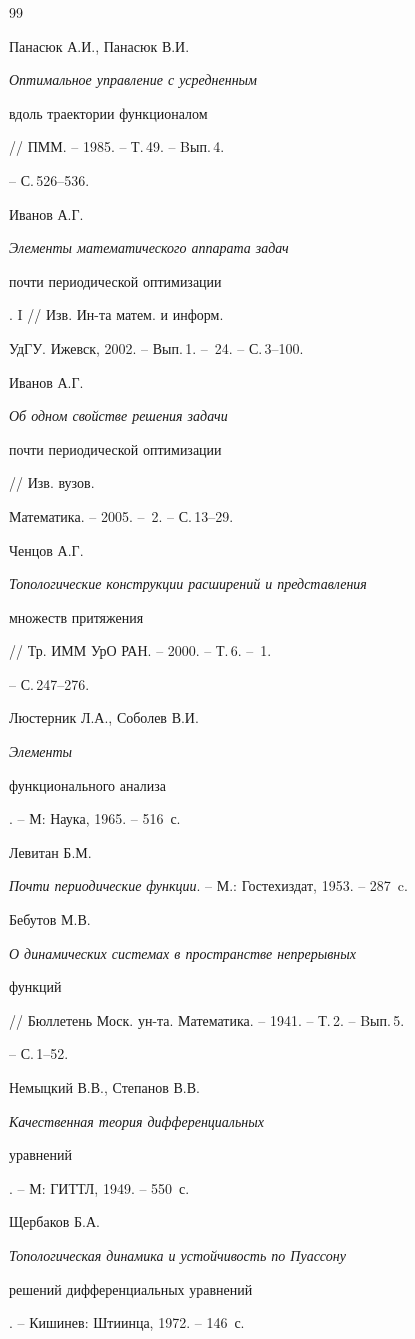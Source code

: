 \begin{thebibliography}{99}


Панасюк А.И., Панасюк В.И. {\em Оптимальное управление с усредненным


вдоль траектории функционалом} // ПММ. -- 1985. -- Т.\,49. -- Bып.\,4.


-- С.\,526--536.




Иванов А.Г. {\em Элементы математического аппарата задач


почти периодической оптимизации}. I // Изв. Ин-та матем. и информ.


УдГУ. Ижевск, 2002. -- Вып.\,1. -- \No\,24. -- С.\,3--100.




Иванов А.Г. {\em Об одном свойстве решения задачи


почти периодической оптимизации} // Изв. вузов.


Математика. -- 2005. -- \No\,2. -- С.\,13--29.




Ченцов А.Г. {\em Топологические конструкции расширений и представления


множеств притяжения} // Тр. ИММ УрО РАН. -- 2000. -- Т.\,6. -- \No\,1.


-- С.\,247--276.




Люстерник Л.А., Соболев В.И. {\em Элементы


функционального анализа}. -- М: Наука, 1965. -- 516~с.




Левитан Б.М.


{\em Почти периодические функции}. -- М.: Гостехиздат, 1953. -- 287~c.




Бебутов М.В. {\em О динамических системах в пространстве непрерывных


функций} // Бюллетень Моск. ун-та. Математика. -- 1941. -- Т.\,2. -- Bып.\,5.


-- С.\,1--52.




Немыцкий В.В., Степанов В.В. {\em Качественная теория дифференциальных


уравнений}. -- М: ГИТТЛ, 1949. -- 550~с.




Щербаков Б.А. {\em Топологическая динамика и устойчивость по Пуассону


решений дифференциальных уравнений}. -- Кишинев: Штиинца, 1972. -- 146~с.



\end{thebibliography}
